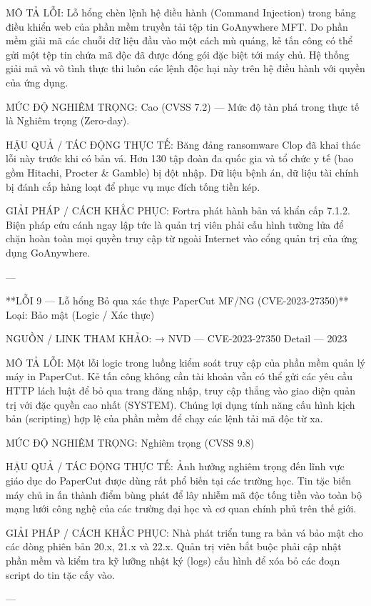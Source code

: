 MÔ TẢ LỖI:
Lỗ hổng chèn lệnh hệ điều hành (Command Injection) trong bảng điều khiển web của phần mềm truyền tải tệp tin GoAnywhere MFT. Do phần mềm giải mã các chuỗi dữ liệu đầu vào một cách mù quáng, kẻ tấn công có thể gửi một tệp tin chứa mã độc đã được đóng gói đặc biệt tới máy chủ. Hệ thống giải mã và vô tình thực thi luôn các lệnh độc hại này trên hệ điều hành với quyền của ứng dụng.

MỨC ĐỘ NGHIÊM TRỌNG:
Cao (CVSS 7.2) — Mức độ tàn phá trong thực tế là Nghiêm trọng (Zero-day).

HẬU QUẢ / TÁC ĐỘNG THỰC TẾ:
Băng đảng ransomware Clop đã khai thác lỗi này trước khi có bản vá. Hơn 130 tập đoàn đa quốc gia và tổ chức y tế (bao gồm Hitachi, Procter \& Gamble) bị đột nhập. Dữ liệu bệnh án, dữ liệu tài chính bị đánh cắp hàng loạt để phục vụ mục đích tống tiền kép.

GIẢI PHÁP / CÁCH KHẮC PHỤC:
Fortra phát hành bản vá khẩn cấp 7.1.2. Biện pháp cứu cánh ngay lập tức là quản trị viên phải cấu hình tường lửa để chặn hoàn toàn mọi quyền truy cập từ ngoài Internet vào cổng quản trị của ứng dụng GoAnywhere.

---

**LỖI 9 — Lỗ hổng Bỏ qua xác thực PaperCut MF/NG (CVE-2023-27350)**
Loại: Bảo mật (Logic / Xác thực)

NGUỒN / LINK THAM KHẢO:
→ NVD — CVE-2023-27350 Detail — 2023

MÔ TẢ LỖI:
Một lỗi logic trong luồng kiểm soát truy cập của phần mềm quản lý máy in PaperCut. Kẻ tấn công không cần tài khoản vẫn có thể gửi các yêu cầu HTTP lách luật để bỏ qua trang đăng nhập, truy cập thẳng vào giao diện quản trị với đặc quyền cao nhất (SYSTEM). Chúng lợi dụng tính năng cấu hình kịch bản (scripting) hợp lệ của phần mềm để chạy các lệnh tải mã độc từ xa.

MỨC ĐỘ NGHIÊM TRỌNG:
Nghiêm trọng (CVSS 9.8)

HẬU QUẢ / TÁC ĐỘNG THỰC TẾ:
Ảnh hưởng nghiêm trọng đến lĩnh vực giáo dục do PaperCut được dùng rất phổ biến tại các trường học. Tin tặc biến máy chủ in ấn thành điểm bùng phát để lây nhiễm mã độc tống tiền vào toàn bộ mạng lưới công nghệ của các trường đại học và cơ quan chính phủ trên thế giới.

GIẢI PHÁP / CÁCH KHẮC PHỤC:
Nhà phát triển tung ra bản vá bảo mật cho các dòng phiên bản 20.x, 21.x và 22.x. Quản trị viên bắt buộc phải cập nhật phần mềm và kiểm tra kỹ lưỡng nhật ký (logs) cấu hình để xóa bỏ các đoạn script do tin tặc cấy vào.

---

